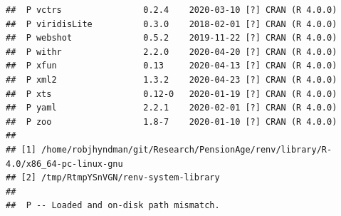 \documentclass[11pt,a4paper,]{article}
\begin{document}
\begin{verbatim}
##  P vctrs                0.2.4    2020-03-10 [?] CRAN (R 4.0.0)                                 
##  P viridisLite          0.3.0    2018-02-01 [?] CRAN (R 4.0.0)                                 
##  P webshot              0.5.2    2019-11-22 [?] CRAN (R 4.0.0)                                 
##  P withr                2.2.0    2020-04-20 [?] CRAN (R 4.0.0)                                 
##  P xfun                 0.13     2020-04-13 [?] CRAN (R 4.0.0)                                 
##  P xml2                 1.3.2    2020-04-23 [?] CRAN (R 4.0.0)                                 
##  P xts                  0.12-0   2020-01-19 [?] CRAN (R 4.0.0)                                 
##  P yaml                 2.2.1    2020-02-01 [?] CRAN (R 4.0.0)                                 
##  P zoo                  1.8-7    2020-01-10 [?] CRAN (R 4.0.0)                                 
## 
## [1] /home/robjhyndman/git/Research/PensionAge/renv/library/R-4.0/x86_64-pc-linux-gnu
## [2] /tmp/RtmpYSnVGN/renv-system-library
## 
##  P -- Loaded and on-disk path mismatch.
\end{verbatim}

\newpage

\printbibliography
\end{document}
